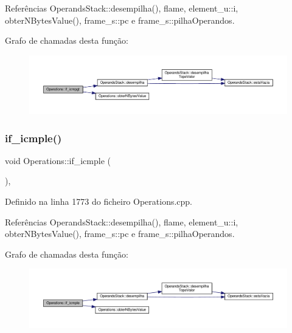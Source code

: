 Referências Operands\+Stack\+::desempilha(), flame, element\+\_\+u\+::i, obter\+N\+Bytes\+Value(), frame\+\_\+s\+::pc e frame\+\_\+s\+::pilha\+Operandos.

Grafo de chamadas desta função\+:
\nopagebreak
\begin{figure}[H]
\begin{center}
\leavevmode
\includegraphics[width=350pt]{classOperations_a40232532d2522ef0afe261555688a7fd_cgraph}
\end{center}
\end{figure}
\mbox{\label{classOperations_a7a5736e30fcd41a1bccb71c615c4e68d}} 
\subsubsection{\texorpdfstring{if\+\_\+icmple()}{if\_icmple()}}
{\footnotesize\ttfamily void Operations\+::if\+\_\+icmple (\begin{DoxyParamCaption}{ }\end{DoxyParamCaption})\hspace{0.3cm}{\ttfamily [static]}, {\ttfamily [private]}}



Definido na linha 1773 do ficheiro Operations.\+cpp.



Referências Operands\+Stack\+::desempilha(), flame, element\+\_\+u\+::i, obter\+N\+Bytes\+Value(), frame\+\_\+s\+::pc e frame\+\_\+s\+::pilha\+Operandos.

Grafo de chamadas desta função\+:
\nopagebreak
\begin{figure}[H]
\begin{center}
\leavevmode
\includegraphics[width=350pt]{classOperations_a7a5736e30fcd41a1bccb71c615c4e68d_cgraph}
\end{center}
\end{figure}
\mbox{\label{classOperations_a06f624059cfada3f4a726d0482078aaa}} 
